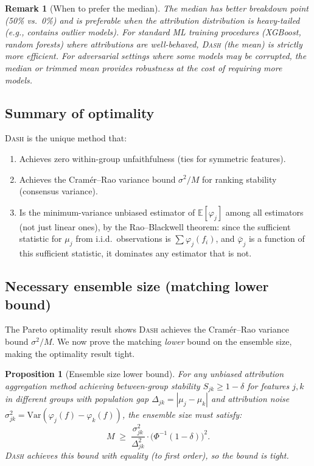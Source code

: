\documentclass{article}
\newcommand{\Var}{\mathrm{Var}}
\newcommand{\DASH}{\textsc{Dash}}
\newtheorem{proposition}[theorem]{Proposition}
\newtheorem{remark}[theorem]{Remark}
\begin{document}
\begin{remark}[When to prefer the median]
The median has better breakdown point (50\% vs.\ 0\%) and is
preferable when the attribution distribution is heavy-tailed
(e.g., contains outlier models). For standard ML training procedures
(XGBoost, random forests) where attributions are well-behaved,
\DASH{} (the mean) is strictly more efficient. For adversarial
settings where some models may be corrupted, the median or trimmed
mean provides robustness at the cost of requiring more models.
\end{remark}

\subsection{Summary of optimality}

\DASH{} is the unique method that:
\begin{enumerate}
    \item Achieves zero within-group unfaithfulness (ties for symmetric features).
    \item Achieves the Cram\'er--Rao variance bound $\sigma^2/M$ for
      ranking stability (consensus variance).
    \item Is the minimum-variance unbiased estimator of
      $\mathbb{E}[\varphi_j]$ among all estimators (not just linear ones),
      by the Rao--Blackwell theorem: since the sufficient statistic for
      $\mu_j$ from i.i.d.\ observations is $\sum \varphi_j(f_i)$,
      and $\bar\varphi_j$ is a function of this sufficient statistic,
      it dominates any estimator that is not.
\end{enumerate}

\subsection{Necessary ensemble size (matching lower bound)}

The Pareto optimality result shows \DASH{} achieves the Cram\'er--Rao
variance bound $\sigma^2/M$. We now prove the matching \emph{lower}
bound on the ensemble size, making the optimality result tight.

\begin{proposition}[Ensemble size lower bound]
\label{prop:ensemble-lower-bound}
For any unbiased attribution aggregation method achieving between-group
stability $S_{jk} \geq 1 - \delta$ for features $j, k$ in different
groups with population gap $\Delta_{jk} = |\mu_j - \mu_k|$ and
attribution noise $\sigma_{jk}^2 = \Var(\varphi_j(f) - \varphi_k(f))$,
the ensemble size must satisfy:
\[
    M \;\geq\; \frac{\sigma_{jk}^2}{\Delta_{jk}^2} \cdot
    \bigl(\Phi^{-1}(1-\delta)\bigr)^2.
\]
\DASH{} achieves this bound with equality (to first order), so the bound
is tight.
\end{proposition}
\end{document}
